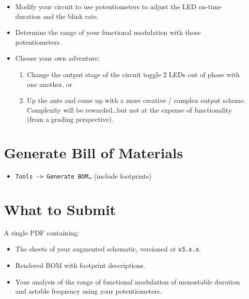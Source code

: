 \documentclass[10pt]{article}
\begin{document}
\begin{itemize}
    \item Modify your circuit to use potentiometers to adjust the LED on-time duration and the blink rate.
    \item Determine the range of your functional modulation with those potentiometers.
    \item Choose your own adventure:
    \begin{enumerate}
        \item Change the output stage of the circuit toggle 2 LEDs out of phase
            with one another, or
        \item Up the ante and come up with a more creative / complex output
            scheme.  Complexity will be rewarded\dots but not at the expense of
            functionality (from a grading perspective).
    \end{enumerate}
\end{itemize}

\section{Generate Bill of Materials}

\begin{itemize}
    \item \texttt{Tools -> Generate BOM\dots} (include footprints)
\end{itemize}

\section{What to Submit}
A single PDF containing:
\begin{itemize}
    \item The sheets of your augmented schematic, versioned at \texttt{v3.x.x}.
    \item Rendered BOM with footprint descriptions.
    \item Your analysis of the range of functional modulation of monostable
        duration and astable frequency using your potentiometers.
\end{itemize}
\end{document}
